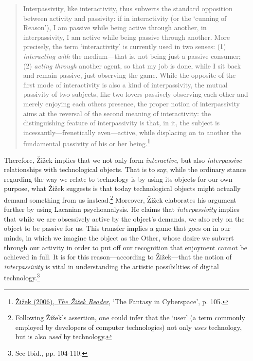 \begin{quote}
Interpassivity, like interactivity, thus subverts the standard opposition between activity and passivity: if in interactivity (or the `cunning of Reason'), I am passive while being active through another, in interpassivity, I am active while being passive through another. More precisely, the term `interactivity' is currently used in two senses: (1) \emph{interacting with} the medium---that is, not being just a passive consumer; (2) \emph{acting through} another agent, so that my job is done, while I sit back and remain passive, just observing the game. While the opposite of the first mode of interactivity is also a kind of interpassivity, the mutual passivity of two subjects, like two lovers passively observing each other and merely enjoying each others presence, the proper notion of interpassivity aims at the reversal of the second meaning of interactivity: the distinguishing feature of interpassivity is that, in it, the subject is incessantly---frenetically even---active, while displacing on to another the fundamental passivity of his or her being.\footnote{\hyperlink{zizekreader}{\v{Z}i\v{z}ek (2006), \emph{The \v{Z}i\v{z}ek Reader}}, `The Fantasy in Cyberspace', p. 105.}
\end{quote}
Therefore, \v{Z}i\v{z}ek implies that we not only form \emph{interactive}, but also \emph{interpassive} relationships with technological objects. That is to say, while the ordinary stance regarding the way we relate to technology is by using its objects for our own purpose, what \v{Z}i\v{z}ek suggests is that today technological objects might actually demand something from us instead.\footnote{Following \v{Z}i\v{z}ek's assertion, one could infer that the `user' (a term commonly employed by developers of computer technologies) not only \emph{uses} technology, but is also \emph{used} by technology.} Moreover, \v{Z}i\v{z}ek elaborates his argument further by using Lacanian psychoanalysis. He claims that \emph{interpassivity} implies that while we are obsessively active by the object's demands, we also rely on the object to be passive for us. This transfer implies a game that goes on in our minds, in which we imagine the object as the Other, whose desire we subvert through our activity in order to put off our recognition that enjoyment cannot be achieved in full. It is for this reason---according to \v{Z}i\v{z}ek---that the notion of \emph{interpassivity} is vital in understanding the artistic possibilities of digital technology.\footnote{See Ibid., pp. 104-110.} 

